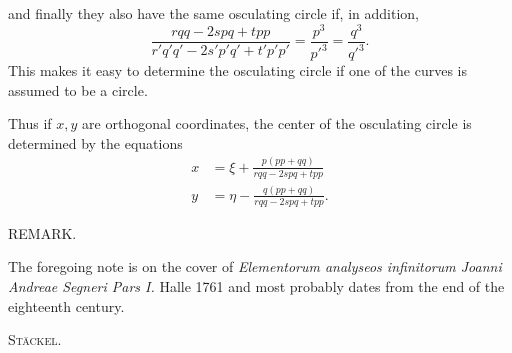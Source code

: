 %
and finally they also have the same osculating circle if, in addition,
\[
\frac{rqq-2spq+tpp}{r'q'q'-2s'p'q'+t'p'p'}=\frac{p^3}{p'^3}=\frac{q^3}{q'^3}.
\]
This makes it easy to determine the osculating circle if one of the curves is assumed to be a circle.

Thus if $x,y$ are orthogonal coordinates, the center of the osculating circle is determined by the equations
\[
\begin{aligned}
x&=\xi+\frac{p(pp+qq)}{rqq-2spq+tpp}\\[5pt]
y&=\eta-\frac{q(pp+qq)}{rqq-2spq+tpp}.
\end{aligned}
\]
\begin{center}REMARK.\end{center}

The foregoing note is on the cover of \textit{Elementorum analyseos infinitorum Joanni Andreae Segneri Pars I.} Halle 1761 and most probably dates from the end of the eighteenth century.\par\nobreak\hfill\textsc{Stäckel.}\par
